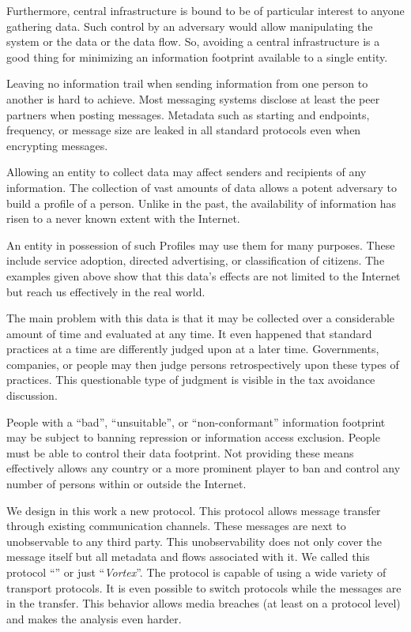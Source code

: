 Furthermore, central infrastructure is bound to be of particular interest to anyone gathering data. Such control by an adversary would allow manipulating the system or the data or the data flow. So, avoiding a central infrastructure is a good thing for minimizing an information footprint available to a single entity.

Leaving no information trail when sending information from one person to another is hard to achieve. Most messaging systems disclose at least the peer partners when posting messages. Metadata such as starting and endpoints, frequency, or message size are leaked in all standard protocols even when encrypting messages.

Allowing an entity to collect data may affect senders and recipients of any information. The collection of vast amounts of data allows a potent adversary to build a  profile of a person. Unlike in the past, the availability of information has risen to a never known extent with the Internet.

An entity in possession of such Profiles may use them for many purposes. These include service adoption, directed advertising, or classification of citizens. The examples given above show that this data's effects are not limited to the Internet but reach us effectively in the real world.

The main problem with this data is that it may be collected over a considerable amount of time and evaluated at any time. It even happened that standard practices at a time are differently judged upon at a later time. Governments, companies, or people may then judge persons retrospectively upon these types of practices. This questionable type of judgment is visible in the tax avoidance discussion\cite{Amat1999}. 

People with a ``bad'', ``unsuitable'', or ``non-conformant'' information footprint may be subject to banning repression or information access exclusion. People must be able to control their data footprint. Not providing these means effectively allows any country or a more prominent player to ban and control any number of persons within or outside the Internet. 

We design in this work a new protocol. This protocol allows message transfer through existing communication channels. These messages are next to unobservable to any third party. This unobservability does not only cover the message itself but all metadata and flows associated with it. We called this protocol ``\MessageVortex'' or just ``\emph{Vortex}''. The protocol is capable of using a wide variety of transport protocols. It is even possible to switch protocols while the messages are in the transfer. This behavior allows media breaches (at least on a protocol level) and makes the analysis even harder.

